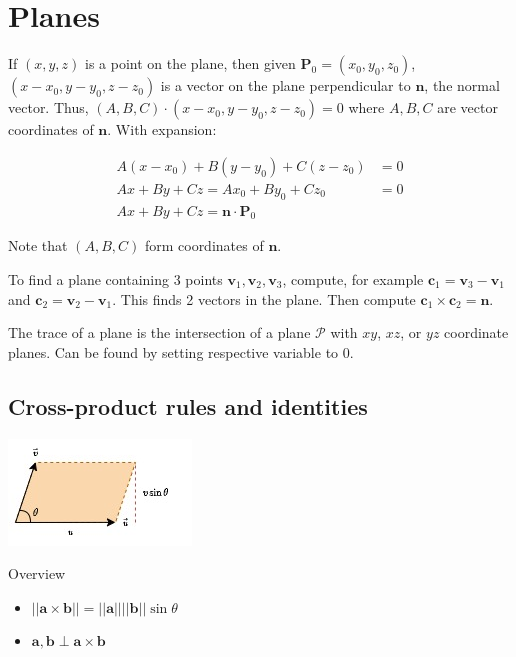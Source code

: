 \section{Planes}

If $(x,y,z)$ is a point on the plane, then given $\textbf{P}_0=(x_0,y_0,z_0)$, $(x-x_0,y-y_0,z-z_0)$ is a vector on the plane perpendicular to $\textbf{n}$, the
normal vector. Thus, $(A,B,C)\cdot(x-x_0,y-y_0,z-z_0)=0$ where $A,B,C$ are vector coordinates of $\textbf{n}$. With expansion:

\begin{align*}
    A(x-x_0)+B(y-y_0)+C(z-z_0)&=0\\
    Ax+By+Cz=Ax_0+By_0+Cz_0&=0\\
    Ax+By+Cz=\textbf{n}\cdot \textbf{P}_0
\end{align*}

Note that $(A,B,C)$ form coordinates of $\textbf{n}$.

To find a plane containing 3 points $\textbf{v}_1,\textbf{v}_2,\textbf{v}_3$, compute, for example $\textbf{c}_1=\textbf{v}_3-\textbf{v}_1$ and $\textbf{c}_2=\textbf{v}_2-\textbf{v}_1$.
This finds 2 vectors in the plane. Then compute $\textbf{c}_1\times \textbf{c}_2=\textbf{n}$. \newline

\noindent
The trace of a plane is the intersection of a plane $\mathcal{P}$ with $xy$, $xz$, or $yz$ coordinate planes. Can be found by setting respective variable to 0.

\subsection{Cross-product rules and identities}

\begin{center}
    \includegraphics[]{figures/cross-product}
\end{center}

Overview
\begin{itemize}
    \item $||\textbf{a}\times \textbf{b}||=||\textbf{a}||||\textbf{b}||\sin\theta$
    \item $\textbf{a},\textbf{b}\perp \textbf{a}\times \textbf{b}$
\end{itemize}

